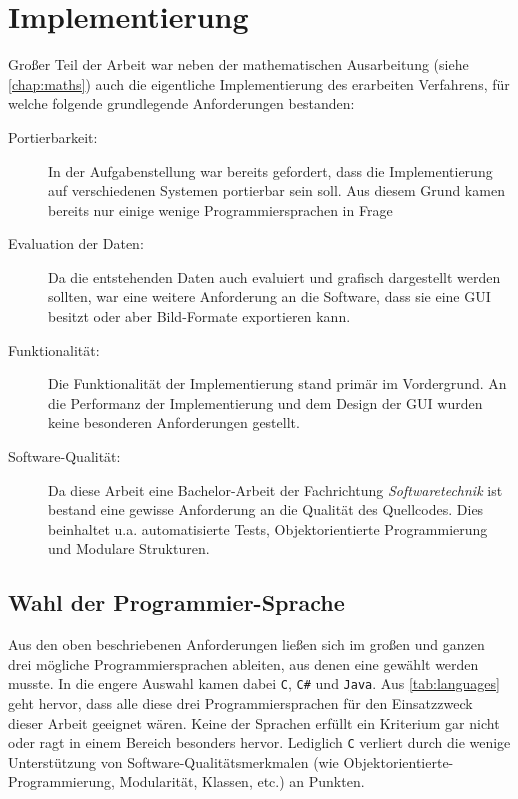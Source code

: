 \chapter{Implementierung}
\label{chap:impl}
Großer Teil der Arbeit war neben der mathematischen Ausarbeitung (siehe \autoref{chap:maths}) auch die eigentliche Implementierung des erarbeiten Verfahrens, für welche folgende grundlegende Anforderungen bestanden:

\begin{description}
\item[Portierbarkeit:] In der Aufgabenstellung war bereits gefordert, dass die Implementierung auf verschiedenen Systemen portierbar sein soll. Aus diesem Grund kamen bereits nur einige wenige Programmiersprachen in Frage
\item[Evaluation der Daten:] Da die entstehenden Daten auch evaluiert und grafisch dargestellt werden sollten, war eine weitere Anforderung an die Software, dass sie eine \gls{GUI} besitzt oder aber Bild-Formate exportieren kann.
\item[Funktionalität:] Die Funktionalität der Implementierung stand primär im Vordergrund. An die Performanz der Implementierung und dem Design der \gls{GUI} wurden keine besonderen Anforderungen gestellt.
\item[Software-Qualität:] Da diese Arbeit eine Bachelor-Arbeit der Fachrichtung \textit{Softwaretechnik} ist bestand eine gewisse Anforderung an die Qualität des Quellcodes. Dies beinhaltet u.a. automatisierte Tests, Objektorientierte Programmierung und Modulare Strukturen.
\end{description}

\section{Wahl der Programmier-Sprache}
\label{sec:language}
Aus den oben beschriebenen Anforderungen ließen sich im großen und ganzen drei mögliche Programmiersprachen ableiten, aus denen eine gewählt werden musste. In die engere Auswahl kamen dabei \texttt{C}, \texttt{C\#} und \texttt{Java}. Aus \autoref{tab:languages} geht hervor, dass alle diese drei Programmiersprachen für den Einsatzzweck dieser Arbeit geeignet wären. Keine der Sprachen erfüllt ein Kriterium gar nicht oder ragt in einem Bereich besonders hervor. Lediglich \texttt{C} verliert durch die wenige Unterstützung von Software-Qualitätsmerkmalen (wie Objektorientierte-Programmierung, Modularität, Klassen, etc.) an Punkten.

